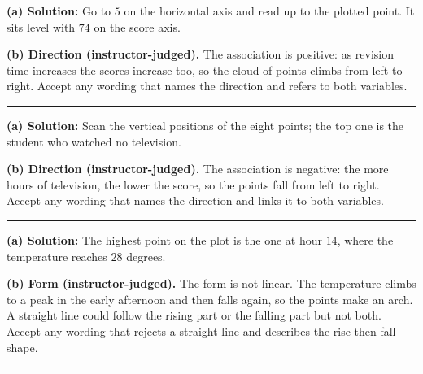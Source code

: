 \documentclass[12pt]{article}
\begin{document}



\textbf{(a) Solution:} \quad Go to $5$ on the horizontal axis and read up to the plotted point.
It sits level with $74$ on the score axis. 

\textbf{(b) Direction (instructor-judged).} The association is positive: as revision time
increases the scores increase too, so the cloud of points climbs from left to right. Accept any
wording that names the direction and refers to both variables.

\vspace{0.2cm}

\noindent\rule{\linewidth}{0.2pt}


\textbf{(a) Solution:} \quad Scan the vertical positions of the eight points; the top one is the
student who watched no television. 

\textbf{(b) Direction (instructor-judged).} The association is negative: the more hours of
television, the lower the score, so the points fall from left to right. Accept any wording that
names the direction and links it to both variables.

\vspace{0.2cm}

\noindent\rule{\linewidth}{0.2pt}


\textbf{(a) Solution:} \quad The highest point on the plot is the one at hour $14$, where the
temperature reaches $28$ degrees. 

\textbf{(b) Form (instructor-judged).} The form is not linear. The temperature climbs to a peak
in the early afternoon and then falls again, so the points make an arch. A straight line could
follow the rising part or the falling part but not both. Accept any wording that rejects a
straight line and describes the rise-then-fall shape.

\vspace{0.2cm}

\noindent\rule{\linewidth}{0.2pt}

\end{document}
